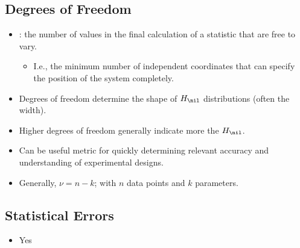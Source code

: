 \begin{itemize}
  \subsection{Degrees of Freedom}
  \begin{itemize}
    \item {}: the number of values in the final calculation of a statistic that are free to vary.
      \begin{itemize}
        \item I.e., the minimum number of independent coordinates that can specify the position of the system completely.
      \end{itemize}
    \item Degrees of freedom determine the shape of \(H_\nil\) distributions (often the width).
    \item Higher degrees of freedom generally indicate more \hyperref[Chapter: Statistical Power and Sample Sizes]{} the \(H_\nil\).
    \item Can be useful metric for quickly determining relevant accuracy and understanding of experimental designs.
    \item Generally, \emph{\(\nu = n - k\)}; with \(n\) data points and \(k\) parameters.
  \end{itemize}

  \subsection{Statistical Errors}
  \begin{itemize}
    \item Yes
    
      
  \end{itemize}

\end{itemize}

